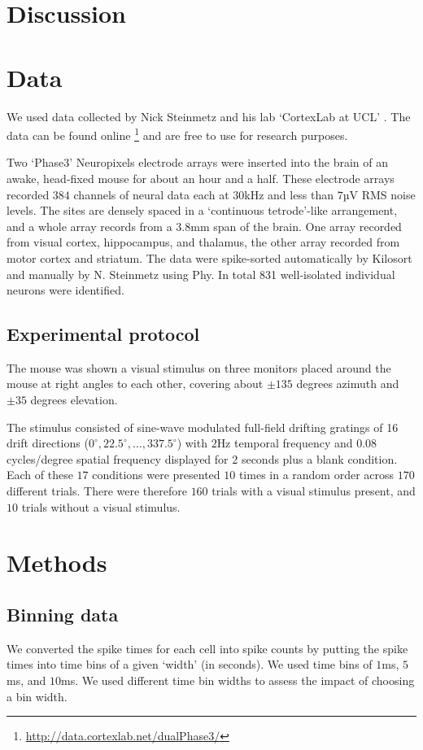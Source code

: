 \documentclass[a4paper,12pt]{article}
\theoremstyle{definition}
\begin{document}
\section{Discussion}

\section{Data}
We used data collected by Nick Steinmetz and his lab `CortexLab at UCL' \cite{steinmetz}. The data can be found online \footnote{\url{http://data.cortexlab.net/dualPhase3/}} and are free to use for research purposes.

Two `Phase3' Neuropixels \cite{jun} electrode arrays were inserted into the brain of an awake, head-fixed mouse for about an hour and a half. These electrode arrays recorded $384$ channels of neural data each at $30$kHz and  less than $7$µV RMS noise levels. The sites are densely spaced in a `continuous tetrode'-like arrangement, and a whole array records from a $3.8$mm span of the brain. One array recorded from visual cortex, hippocampus,  and thalamus, the other array recorded from motor cortex and striatum. The data were spike-sorted automatically by Kilosort and manually by N. Steinmetz using Phy. In total 831 well-isolated individual neurons were identified.

  \subsection{Experimental protocol}
  The mouse was shown a visual stimulus on three monitors placed around the mouse at right angles to each other, covering about $\pm 135$ degrees azimuth and $\pm 35$ degrees elevation.

  The stimulus consisted of sine-wave modulated full-field drifting gratings of 16 drift directions ($0^{\circ}, 22.5^{\circ}, \dots, 337.5^{\circ}$) with $2$Hz temporal frequency and $0.08$ cycles/degree spatial frequency displayed for $2$ seconds plus a blank condition. Each of these $17$ conditions were presented $10$ times in a random order across $170$ different trials. There were therefore $160$ trials with a visual stimulus present, and $10$ trials without a visual stimulus.

\section{Methods}

    \subsection{Binning data}
    We converted the spike times for each cell into spike counts by putting the spike times into time bins of a given `width' (in seconds). We used time bins of $1$ms, $5$ms, and $10$ms. We used different time bin widths to assess the impact of choosing a bin width.
\end{document}
